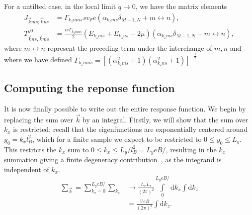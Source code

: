 \begin{summary}
  For a untilted case, in the local limit \( q\to 0 \), we have the matrix elements
  \begin{align}
    J_{\vec{k} ms; \vec{k} ns}&=
                                \Gamma_{k_z m n s}
                                sv_F e
                                \left(
                                \alpha_{k_z m s} \delta _{M-1, N}
                                + m\leftrightarrow n
                                \right),\\
    T^{y 0}_{\vec{k} ns, \vec{k}ms} &=
                                           \frac{is \Gamma_{k_z m n s}}{2}
                                           \left(E_{k_z m s} + E_{k_z n s}- 2\mu \right)
                                           \left(
                                           \alpha_{k_z m s} \delta_{M-1, N}
                                           -
                                           m\leftrightarrow n
                                           \right),
  \end{align}
where \( m \leftrightarrow n \) represent the preceding term under the interchange of \( m, n \) and where we have defined
$
\Gamma_{k_z m n s} =
\left[(\alpha_{k_zm s}^2 + 1) (\alpha_{k_z n s}^2 + 1) \right]^{-\frac{1}{2}}
$.
\end{summary}

\subsection{Computing the reponse function}
\label{sec:response_notilt}
It is now finally possible to write out the entire response function.
We begin by replacing the sum over \( \vec{k} \) by an integral.
Firstly, we will show that the sum over $k_x$ is restricted;
recall that the eigenfunctions are exponentially centered around $y_0 = k_x l_B^2$, which for a finite sample we expect to be restricted to $0 \leq y_0 \leq L_y$.
This restricts the $k_x$ sum to $0 \leq k_x \leq L_y / l_B^2 = L_ye B / $, resulting in the $k_x$ summation giving a finite degeneracy contribution~\cites[Ch.~1.4.1]{tongGaugeTheoryLecture}{linderIntermediateQuantumMechanics2017}, as the integrand is independent of \( k_x \).
\begin{align}
  \sum\limits_{\vec{k}}^{} = \sum\limits_{k_x = 0}^{L_y eB /  } \sum\limits_{k_z}^{} &\to
                                                                                            \frac{L_xL_z}{(2\pi )^2} \int\limits_0^{L_y e B / } \mathrm{d}k_x \int\mathrm{d}k_z \\
  &= \frac{\mathcal{V} e B}{(2 \pi)^2  } \int \mathrm{d}k_{z}.
\end{align}


